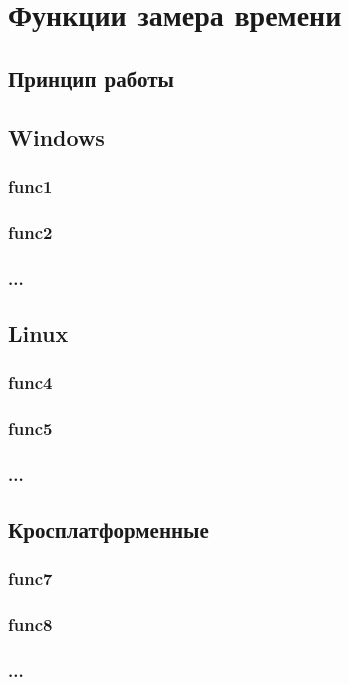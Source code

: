 \documentclass{article}
\begin{document}
	\section{Функции замера времени}
		\subsection{Принцип работы}
		\subsection{Windows}
			\subsubsection{func1}
			\subsubsection{func2}
			\subsubsection{...}
		\subsection{Linux}
			\subsubsection{func4}
			\subsubsection{func5}
			\subsubsection{...}
		\subsection{Кросплатформенные}
			\subsubsection{func7}
			\subsubsection{func8}
			\subsubsection{...}
\end{document}
